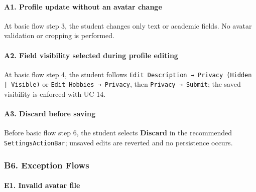 \documentclass[12pt]{article}
\begin{document}
\hypertarget{sec:a1-profile-update-without-an-avatar-change}{}
\paragraph*{A1. Profile update without an avatar change}
\par\medskip

At basic flow step 3, the student changes only text or academic fields. No avatar validation or cropping is performed.
\par\medskip

\hypertarget{sec:a2-field-visibility-selected-during-profile-editing}{}
\paragraph*{A2. Field visibility selected during profile editing}
\par\medskip

At basic flow step 4, the student follows \texttt{Edit Description → Privacy (Hidden | Visible)} or \texttt{Edit Hobbies → Privacy}, then \texttt{Privacy → Submit}; the saved visibility is enforced with UC-14.
\par\medskip

\hypertarget{sec:a3-discard-before-saving}{}
\paragraph*{A3. Discard before saving}
\par\medskip

Before basic flow step 6, the student selects \textbf{Discard} in the recommended \texttt{SettingsActionBar}; unsaved edits are reverted and no persistence occurs.
\par\medskip

\hypertarget{sec:b6-exception-flows}{}
\subsubsection*{B6. Exception Flows}
\par\medskip

\hypertarget{sec:e1-invalid-avatar-file}{}
\paragraph*{E1. Invalid avatar file}
\par\medskip
\end{document}

